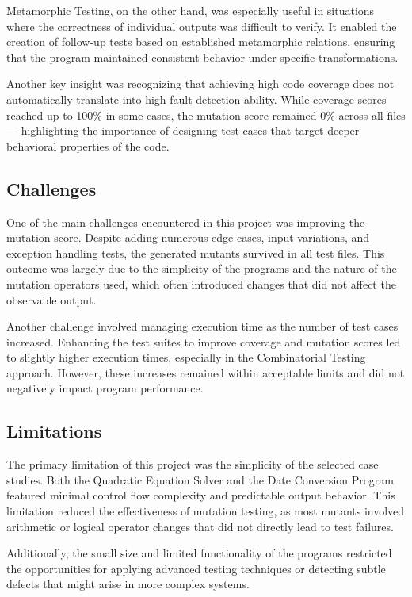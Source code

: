 \documentclass[conference]{IEEEtran}
\begin{document}
Metamorphic Testing, on the other hand, was especially useful in situations where the correctness of individual outputs was difficult to verify. It enabled the creation of follow-up tests based on established metamorphic relations, ensuring that the program maintained consistent behavior under specific transformations.

Another key insight was recognizing that achieving high code coverage does not automatically translate into high fault detection ability. While coverage scores reached up to 100\% in some cases, the mutation score remained 0\% across all files --- highlighting the importance of designing test cases that target deeper behavioral properties of the code.

\subsection{Challenges}
One of the main challenges encountered in this project was improving the mutation score. Despite adding numerous edge cases, input variations, and exception handling tests, the generated mutants survived in all test files. This outcome was largely due to the simplicity of the programs and the nature of the mutation operators used, which often introduced changes that did not affect the observable output.

Another challenge involved managing execution time as the number of test cases increased. Enhancing the test suites to improve coverage and mutation scores led to slightly higher execution times, especially in the Combinatorial Testing approach. However, these increases remained within acceptable limits and did not negatively impact program performance.

\subsection{Limitations}
The primary limitation of this project was the simplicity of the selected case studies. Both the Quadratic Equation Solver and the Date Conversion Program featured minimal control flow complexity and predictable output behavior. This limitation reduced the effectiveness of mutation testing, as most mutants involved arithmetic or logical operator changes that did not directly lead to test failures.

Additionally, the small size and limited functionality of the programs restricted the opportunities for applying advanced testing techniques or detecting subtle defects that might arise in more complex systems.
\end{document}
